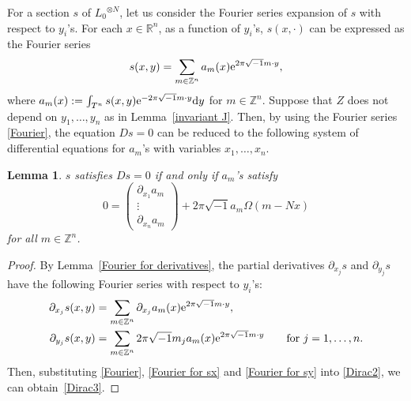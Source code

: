 \documentclass[pdftex]{sigma}
\numberwithin{equation}{section}
\newtheorem{Lemma}[Theorem]{Lemma}
\newcommand{\R}{\mathbb{R}}
\newcommand{\Z}{\mathbb{Z}}
\begin{document}
For a section $s$ of ${L_0}^{\otimes N}$, let us consider the Fourier series expansion of $s$ with respect to $y_i$'s. For each $x\in \R^n$, as a function of $y_i$'s, $s(x, \cdot )$ can be expressed as the Fourier series
\begin{equation}\label{Fourier}
s(x,y)=\sum_{m\in \Z^n}a_m(x){\rm e}^{2\pi\sqrt{-1}m\cdot y},
\end{equation}
where
$
a_m(x):=\int_{T^n}s(x,y){\rm e}^{-2\pi\sqrt{-1}m\cdot y}{\rm d}y
$
for $m\in \Z^n$. Suppose that $Z$ does not depend on $y_1, \ldots , y_n$ as in Lemma~\ref{invariant J}. Then, by using the Fourier series \eqref{Fourier}, the equation $Ds=0$ can be reduced to the following system of differential equations for $a_m$'s with variables $x_1,\ldots ,x_n$.
\begin{Lemma}
$s$ satisfies $Ds=0$ if and only if $a_m$'s satisfy
\begin{equation}\label{Dirac3}
0=
\begin{pmatrix}
\partial_{x_1}a_m\\
\vdots \\
\partial_{x_n}a_m
\end{pmatrix}
+2\pi\sqrt{-1}a_m\Omega
(m-Nx)
\end{equation}
for all $m\in \Z^n$.
\end{Lemma}
\begin{proof}
By Lemma~\ref{Fourier for derivatives}, the partial derivatives $\partial_{x_j}s$ and $\partial_{y_j}s$ have the following Fourier series with respect to $y_i$'s:
\begin{align}
\partial_{x_j}s(x,y)&=\sum_{m\in \Z^n}\partial_{x_j}a_m(x){\rm e}^{2\pi\sqrt{-1}m\cdot y},\label{Fourier for sx} \\
\partial_{y_j}s(x,y)&=\sum_{m\in \Z^n}2\pi\sqrt{-1}m_ja_m(x){\rm e}^{2\pi\sqrt{-1}m\cdot y} \qquad\text{for $j=1,\ldots , n$.}\label{Fourier for sy}
\end{align}
Then, substituting \eqref{Fourier}, \eqref{Fourier for sx} and \eqref{Fourier for sy} into \eqref{Dirac2}, we can obtain~\eqref{Dirac3}.
\end{proof}
\end{document}
